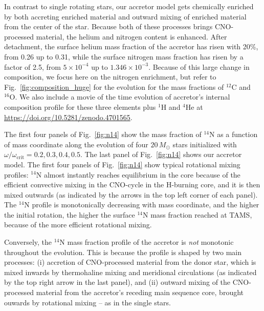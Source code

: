 \documentclass[twocolumn,twocolappendix,trackchanges]{aastex63}
\DeclareRobustCommand{\Figref}[1]{Fig.~\ref{#1}}
\begin{document}
In contrast to single rotating stars, our accretor model gets chemically enriched by both accreting enriched material and outward mixing of enriched material from the center of the star. Because both of these processes brings CNO-processed material, the helium and nitrogen content is enhanced. After detachment, the surface helium mass fraction of the accretor has risen with 20\%, from 0.26 up to 0.31, while the surface nitrogen mass fraction has risen by a factor of 2.5, from $5\times 10^{-4}$ up to $1.346 \times 10^{-3}$. Because of this large change in composition, we focus here on the nitrogen enrichment, but refer to \Figref{fig:composition_huge} for the evolution for the mass fractions of $^{12}\mathrm{C}$ and $^{16}\mathrm{O}$. We also include a movie of the time evolution of accretor's internal composition profile for these three elements plus $^1\mathrm{H}$ and $^4\mathrm{He}$ at \url{https://doi.org/10.5281/zenodo.4701565}.

The first four panels of
\Figref{fig:n14} show the mass fraction of $^{14}\mathrm{N}$ as a
function of mass coordinate along the evolution of four $20\,M_\odot$
stars initialized with $\omega/\omega_\mathrm{crit}=0.2,0.3,0.4,0.5$.
The last panel of \Figref{fig:n14} shows our accretor model. 
The first four panels of \Figref{fig:n14} show typical rotational
mixing profiles: $^{14}\mathrm{N}$ almost instantly reaches equilibrium in the core because
of the efficient convective mixing in the CNO-cycle in the H-burning core, and it is then mixed outwards (as indicated by the
arrows in the top left corner of each panel). 
The $^{14}\mathrm{N}$ profile is monotonically decreasing with mass
coordinate, and the higher the initial rotation, the higher the
surface $^{14}\mathrm{N}$ mass fraction reached at TAMS, because of the
more efficient rotational mixing.

Conversely, the $^{14}\mathrm{N}$ mass fraction profile of the
accretor is \emph{not} monotonic throughout the evolution.  This is because the
profile is shaped by two main processes: (i) accretion of
CNO-processed material from the donor star, which is mixed inwards by thermohaline mixing and meridional
circulations (as indicated by the top right
arrow in the last panel), and (ii) outward mixing of the CNO-processed
material from the accretor's receding main sequence core, brought ouwards by rotational mixing -- as in
the single stars. %
\end{document}
